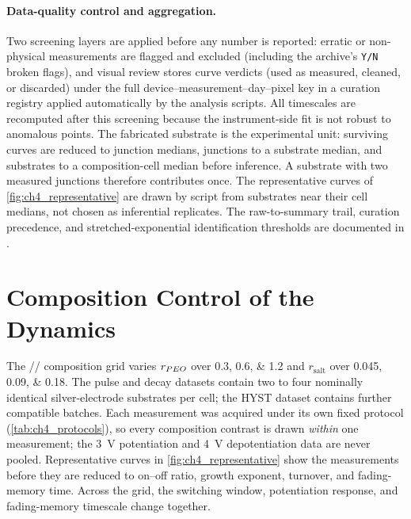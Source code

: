 \documentclass[12pt, twoside]{report}
\begin{document}
\paragraph{Data-quality control and aggregation.} Two screening layers are applied before any number is reported: erratic or non-physical measurements are flagged and excluded (including the archive's \texttt{Y/N} broken flags), and visual review stores curve verdicts (used as measured, cleaned, or discarded) under the full device--measurement--day--pixel key in a curation registry applied automatically by the analysis scripts. All timescales are recomputed after this screening because the instrument-side fit is not robust to anomalous points. The fabricated substrate is the experimental unit: surviving curves are reduced to junction medians, junctions to a substrate median, and substrates to a composition-cell median before inference. A substrate with two measured junctions therefore contributes once. The representative curves of \cref{fig:ch4_representative} are drawn by script from substrates near their cell medians, not chosen as inferential replicates. The raw-to-summary trail, curation precedence, and stretched-exponential identification thresholds are documented in .

\section{Composition Control of the Dynamics}\label{sec:ch4_composition}

The \SY{}/\PEO{}/\LiTf{} composition grid varies \(r_{PEO{}}\) over \numlist{0.3;0.6;1.2} and \(r_{\mathrm{salt}}\) over \numlist{0.045;0.09;0.18}. The pulse and decay datasets contain two to four nominally identical silver-electrode substrates per cell; the HYST dataset contains further compatible batches. Each measurement was acquired under its own fixed protocol (\cref{tab:ch4_protocols}), so every composition contrast is drawn \emph{within} one measurement; the \SI{3}{\volt} potentiation and \SI{4}{\volt} depotentiation data are never pooled. Representative curves in \cref{fig:ch4_representative} show the measurements before they are reduced to on--off ratio, growth exponent, turnover, and fading-memory time. Across the grid, the switching window, potentiation response, and fading-memory timescale change together.
\end{document}
